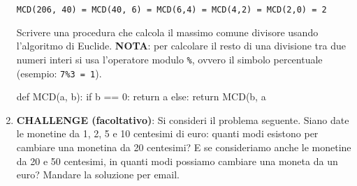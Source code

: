 \documentclass[11pt,a4]{article}
\begin{document}
\begin{enumerate}
\begin{verbatim}
MCD(206, 40) = MCD(40, 6) = MCD(6,4) = MCD(4,2) = MCD(2,0) = 2
\end{verbatim}

Scrivere una procedura che calcola il massimo comune divisore usando l'algoritmo di Euclide.
{\bf NOTA}: per calcolare il resto di una divisione tra due numeri interi si usa l'operatore modulo {\tt \%}, 
ovvero il simbolo percentuale (esempio: {\tt 7\%3 = 1}).

\begin{python}
def MCD(a, b):
    if b == 0:
        return a
    else:
        return MCD(b, a %
\end{python}

\item {\bf CHALLENGE (facoltativo)}: Si consideri il problema seguente. Siano date le monetine
da 1, 2, 5 e 10 centesimi di euro: quanti modi esistono per cambiare una monetina da 20 centesimi?
E se consideriamo anche le monetine da 20 e 50 centesimi, 
in quanti modi possiamo cambiare una moneta da un euro? Mandare la soluzione per email.

\end{enumerate}
\end{document}

